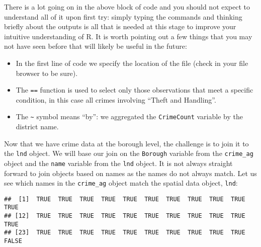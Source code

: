 \documentclass[]{article}
\newenvironment{Shaded}{}{}
\newcommand{\StringTok}[1]{\textcolor[rgb]{0.25,0.44,0.63}{{#1}}}
\newcommand{\CommentTok}[1]{\textcolor[rgb]{0.38,0.63,0.69}{\textit{{#1}}}}
\newcommand{\NormalTok}[1]{{#1}}
\begin{document}
There is a lot going on in the above block of code and you should not
expect to understand all of it upon first try: simply typing the
commands and thinking briefly about the outputs is all that is needed at
this stage to improve your intuitive understanding of R. It is worth
pointing out a few things that you may not have seen before that will
likely be useful in the future:

\begin{itemize}
\itemsep1pt\parskip0pt
\item
  In the first line of code we specify the location of the file (check
  in your file browser to be sure).
\item
  The \texttt{==} function is used to select only those observations
  that meet a specific condition, in this case all crimes involving
  ``Theft and Handling''.
\item
  The \texttt{\textasciitilde{}} symbol means ``by'': we aggregated the
  \texttt{CrimeCount} variable by the district name.
\end{itemize}

Now that we have crime data at the borough level, the challenge is to
join it to the \texttt{lnd} object. We will base our join on the
\texttt{Borough} variable from the \texttt{crime\_ag} object and the
\texttt{name} variable from the \texttt{lnd} object. It is not always
straight forward to join objects based on names as the names do not
always match. Let us see which names in the \texttt{crime\_ag} object
match the spatial data object, \texttt{lnd}:

\begin{Shaded}
\end{Shaded}

\begin{verbatim}
##  [1]  TRUE  TRUE  TRUE  TRUE  TRUE  TRUE  TRUE  TRUE  TRUE  TRUE  TRUE
## [12]  TRUE  TRUE  TRUE  TRUE  TRUE  TRUE  TRUE  TRUE  TRUE  TRUE  TRUE
## [23]  TRUE  TRUE  TRUE  TRUE  TRUE  TRUE  TRUE  TRUE  TRUE  TRUE FALSE
\end{verbatim}

\begin{Shaded}
\end{Shaded}
\end{document}
